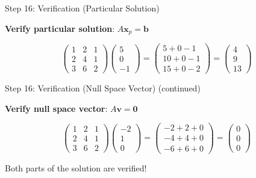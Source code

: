\documentclass[10pt]{beamer}
\theoremstyle{definition}
\newcommand{\x}[1]{\alert{\textbf{#1}}}
\begin{document}
\begin{frame}{Step 16: Verification (Particular Solution)}

\x{Verify particular solution}: $A\mathbf{x}_p = \mathbf{b}$

$$\begin{pmatrix} 1&2&1 \\ 2&4&1 \\ 3&6&2 \end{pmatrix} \begin{pmatrix} 5\\0\\-1 \end{pmatrix} = \begin{pmatrix} 5+0-1 \\ 10+0-1 \\ 15+0-2 \end{pmatrix} = \begin{pmatrix} 4\\9\\13 \end{pmatrix}$$ \checkmark

\end{frame}

\begin{frame}{Step 16: Verification (Null Space Vector) (continued)}

\x{Verify null space vector}: $A\mathbf{v} = \mathbf{0}$

$$\begin{pmatrix} 1&2&1 \\ 2&4&1 \\ 3&6&2 \end{pmatrix} \begin{pmatrix} -2\\1\\0 \end{pmatrix} = \begin{pmatrix} -2+2+0 \\ -4+4+0 \\ -6+6+0 \end{pmatrix} = \begin{pmatrix} 0\\0\\0 \end{pmatrix}$$ \checkmark

\vspace{1em}

Both parts of the solution are verified!

\end{frame}
\end{document}
